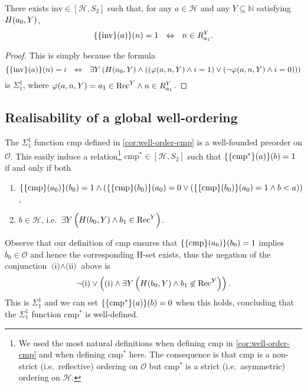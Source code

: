 \documentclass[11pt]{article}
\theoremstyle{plain}
\theoremstyle{definition}
\newcommand{\Rec}{\mathrm{Rec}}
\begin{document}
\begin{proposition}
    There exists $\mathrm{inv} \in \left[\mathcal{H}, S_2\right]$ such that, for any $a \in \mathcal{H}$ and any $Y \subseteq \mathbb{N}$ satisfying $H\mleft(a_0, Y\mright)$,
    \[\mleft\{\mleft\{\mathrm{inv}\mright\}\mleft(a\mright)\mright\}\mleft(n\mright) = 1 \ \ \Leftrightarrow \ \ n \in R^Y_{a_1}.\]
\end{proposition}

\begin{proof}
    This is simply because the formula
    \[\mleft\{\mleft\{\mathrm{inv}\mright\}\mleft(a\mright)\mright\}\mleft(n\mright) = i \ \ \ratio\Leftrightarrow \ \ \exists Y \left(H\mleft(a_0, Y\mright) \land \left(\left(\varphi\mleft(a, n, Y\mright) \land i = 1\right) \lor \left(\neg \varphi\mleft(a, n, Y\mright) \land i = 0\right)\right)\right)\]
    is $\Sigma^1_1$, where $\varphi\mleft(a, n, Y\mright) = a_1 \in \Rec^Y \land n \in R^Y_{a_1}$.
\end{proof}

\subsection{Realisability of a global well-ordering}
\label{subsec:realisability-cm-gwo-in-atr}

The $\Sigma^1_1$ function $\mathrm{cmp}$ defined in \autoref{cor:well-order-cmp} is a well-founded preorder on $\mathcal{O}$. This easily induce a relation\footnote{We used the most natural definitions when defining $\mathrm{cmp}$ in \autoref{cor:well-order-cmp} and when defining $\mathrm{cmp}^*$ here. The consequence is that $\mathrm{cmp}$ is a non-strict (i.e.\ reflective) ordering on $\mathcal{O}$ but $\mathrm{cmp}^*$ is a strict (i.e.\ asymmetric) ordering on $\mathcal{H}$.} $\mathrm{cmp}^* \in \left[\mathcal{H}, S_2\right]$  such that $\mleft\{\mleft\{\mathrm{cmp}^*\mright\}\mleft(a\mright)\mright\}\mleft(b\mright) = 1$ if and only if both
\begin{enumerate}[label=(\roman*)]
    \item $\mleft\{\mleft\{\mathrm{cmp}\mright\}\mleft(a_0\mright)\mright\}\mleft(b_0\mright) = 1 \land \left(\mleft\{\mleft\{\mathrm{cmp}\mright\}\mleft(b_0\mright)\mright\}\mleft(a_0\mright) = 0 \lor \left(\mleft\{\mleft\{\mathrm{cmp}\mright\}\mleft(b_0\mright)\mright\}\mleft(a_0\mright) = 1 \land b < a\right)\right)$,
    \item $b \in \mathcal{H}$, i.e.\ $\exists Y \left(H\mleft(b_0, Y\mright) \land b_1 \in \Rec^Y\right)$.
\end{enumerate}
Observe that our definition of $\mathrm{cmp}$ ensures that $\mleft\{\mleft\{\mathrm{cmp}\mright\}\mleft(a_0\mright)\mright\}\mleft(b_0\mright) = 1$ implies $b_0 \in \mathcal{O}$ and hence the corresponding $\mathrm{H}$-set exists, thus the negation of the conjunction $\text{(i)} \land \text{(ii)}$ above is
\[\neg \text{(i)} \lor \left(\text{(i)} \land \exists Y \left(H\mleft(b_0, Y\mright) \land b_1 \not\in \Rec^Y\right)\right).\]
This is $\Sigma^1_1$ and we can set $\mleft\{\mleft\{\mathrm{cmp}^*\mright\}\mleft(a\mright)\mright\}\mleft(b\mright) = 0$ when this holds, concluding that the $\Sigma^1_1$ function $\mathrm{cmp}^*$ is well-defined.
\end{document}

